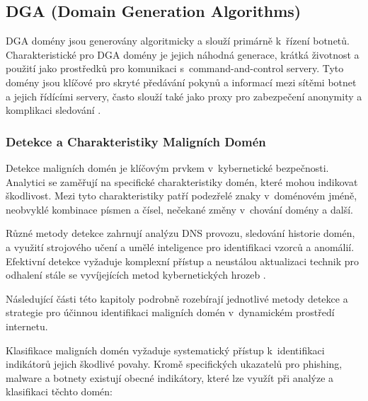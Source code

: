 \subsection{DGA (Domain Generation Algorithms)}
DGA domény jsou generovány algoritmicky a slouží primárně k~řízení botnetů. Charakteristické pro DGA domény je jejich náhodná generace, krátká životnost a použití jako prostředků pro komunikaci s~command-and-control servery. Tyto domény jsou klíčové pro skryté předávání pokynů a informací mezi sítěmi botnet a jejich řídícími servery, často slouží také jako proxy pro zabezpečení anonymity a komplikaci sledování \cite{yadav2010detecting}.


\subsubsection{Detekce a Charakteristiky Maligních Domén}
Detekce maligních domén je klíčovým prvkem v~kybernetické bezpečnosti. Analytici se zaměřují na specifické charakteristiky domén, které mohou indikovat škodlivost. Mezi tyto charakteristiky patří podezřelé znaky v~doménovém jméně, neobvyklé kombinace písmen a čísel, nečekané změny v~chování domény a další.

Různé metody detekce zahrnují analýzu DNS provozu, sledování historie domén, a využití strojového učení a umělé inteligence pro identifikaci vzorců a anomálií. Efektivní detekce vyžaduje komplexní přístup a neustálou aktualizaci technik pro odhalení stále se vyvíjejících metod kybernetických hrozeb \cite{bilge2011exposure}.

Následující části této kapitoly podrobně rozebírají jednotlivé metody detekce a strategie pro účinnou identifikaci maligních domén v~dynamickém prostředí internetu.

Klasifikace maligních domén vyžaduje systematický přístup k~identifikaci indikátorů jejich škodlivé povahy. Kromě specifických ukazatelů pro phishing, malware a botnety existují obecné indikátory, které lze využít při analýze a klasifikaci těchto domén:

